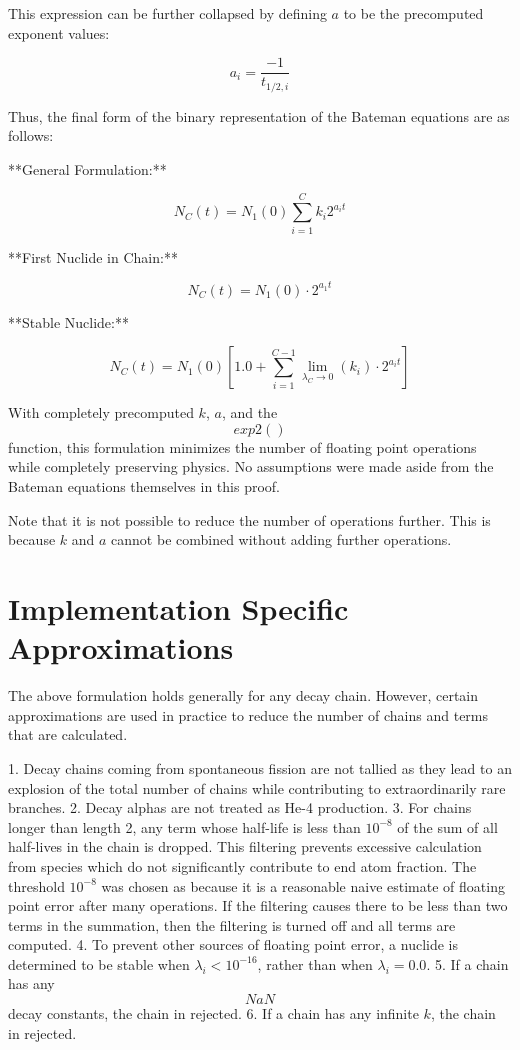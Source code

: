 \documentclass{anstrans}
\begin{document}
This expression can be further collapsed by defining $a$ to be the precomputed 
exponent values:

\begin{equation}
\label{a_i}
a_i = \frac{-1}{t_{1/2,i}}
\end{equation}

Thus, the final form of the binary representation of the Bateman equations are
as follows:

**General Formulation:** 

\begin{equation}
\label{nc_wakka}
N_C(t) = N_1(0) \sum_{i=1}^C k_{i} 2^{a_i t}
\end{equation}

**First Nuclide in Chain:**

\begin{equation}
\label{nc_jawakka}
N_C(t) = N_1(0) \cdot 2^{a_1 t}
\end{equation}

**Stable Nuclide:**

\begin{equation}
\label{nc_brown_shoes}
N_C(t) = N_1(0) \left[1.0 + \sum_{i=1}^{C-1} \lim_{\lambda_C\to 0}(k_{i}) \cdot 2^{a_i t} \right]
\end{equation}


With completely precomputed $k$, $a$, and the $$exp2()$$ function, this 
formulation minimizes the number of floating point operations while completely 
preserving physics. No assumptions were made aside from the Bateman equations 
themselves in this proof.

Note that it is not possible to reduce the number of operations further.  This 
is because  $k$ and $a$ cannot be combined without adding further 
operations.

\section{Implementation Specific Approximations}
The above formulation holds generally for any decay chain.  However, certain 
approximations are used in practice to reduce the number of chains and terms 
that are calculated.

1. Decay chains coming from spontaneous fission are not tallied as they 
   lead to an explosion of the total number of chains while contributing to 
   extraordinarily rare branches.
2. Decay alphas are not treated as He-4 production.
3. For chains longer than length 2, any 
   term whose half-life is less than $10^{-8}$ of the sum of all 
   half-lives in the chain is dropped. This filtering prevents excessive
   calculation from species which do not significantly contribute to 
   end atom fraction. The threshold $10^{-8}$ was chosen as 
   because it is a reasonable naive estimate of floating point error after 
   many operations. If the filtering causes there to be less than 
   two terms in the summation, then the filtering is turned off and all
   terms are computed.
4. To prevent other sources of floating point error, a nuclide is determined 
   to be stable when $\lambda_i < 10^{-16}$, rather than when 
   $\lambda_i = 0.0$.
5. If a chain has any $$NaN$$ decay constants, the chain in rejected.
6. If a chain has any infinite $k$, the chain in rejected.
\end{document}
